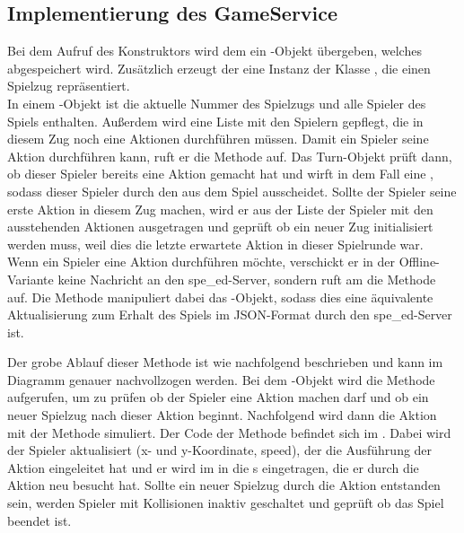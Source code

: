 \subsection{Implementierung des GameService}
\label{subsec:game-service}

Bei dem Aufruf des Konstruktors wird dem  ein -Objekt übergeben, welches abgespeichert
wird.
Zusätzlich erzeugt der  eine Instanz der Klasse , die einen Spielzug repräsentiert. \\

In einem -Objekt ist die aktuelle Nummer des Spielzugs und alle Spieler des Spiels enthalten.
Außerdem wird eine Liste mit den Spielern gepflegt, die in diesem Zug noch eine Aktionen durchführen müssen.
Damit ein Spieler seine Aktion durchführen kann, ruft er die Methode  auf.
Das Turn-Objekt prüft dann, ob dieser Spieler bereits eine Aktion gemacht hat und wirft in dem Fall eine
, sodass dieser Spieler durch den  aus dem Spiel ausscheidet.
Sollte der Spieler seine erste Aktion in diesem Zug machen, wird er aus der Liste der Spieler mit den ausstehenden
Aktionen ausgetragen und geprüft ob ein neuer Zug initialisiert werden muss, weil dies die letzte erwartete Aktion
in dieser Spielrunde war. \\

Wenn ein Spieler eine Aktion durchführen möchte, verschickt er in der Offline-Variante keine Nachricht an den spe\_ed-Server,
sondern ruft am  die Methode  auf.
Die Methode manipuliert dabei das -Objekt, sodass dies eine äquivalente Aktualisierung zum Erhalt des Spiels
im JSON-Format durch den spe\_ed-Server ist.

Der grobe Ablauf dieser Methode ist wie nachfolgend beschrieben und kann im Diagramm genauer nachvollzogen werden.
Bei dem -Objekt wird die Methode  aufgerufen, um zu prüfen ob der Spieler eine
Aktion machen darf und ob ein neuer Spielzug nach dieser Aktion beginnt.
Nachfolgend wird dann die Aktion mit der Methode 
simuliert.
Der Code der Methode befindet sich im .
Dabei wird der Spieler aktualisiert (x- und y-Koordinate, speed), der die Ausführung der Aktion eingeleitet hat und er
wird im  in die s eingetragen, die er durch die Aktion neu besucht hat.
Sollte ein neuer Spielzug durch die Aktion entstanden sein, werden Spieler mit Kollisionen inaktiv geschaltet und
geprüft ob das Spiel beendet ist. \\

